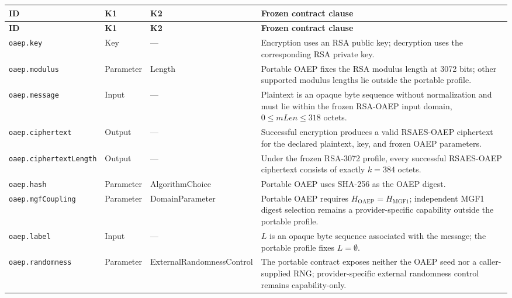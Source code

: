 \documentclass[11pt,a4paper]{article}
\begin{document}
\begin{longtable}{p{}p{}p{}p{}}
\toprule
\textbf{ID} & \textbf{K1} & \textbf{K2} & \textbf{Frozen contract clause}\\
\midrule
\endfirsthead
\toprule
\textbf{ID} & \textbf{K1} & \textbf{K2} & \textbf{Frozen contract clause}\\
\midrule
\endhead

\texttt{oaep.key} &
Key &
--- &
Encryption uses an RSA public key; decryption uses the corresponding RSA private key.\\

\texttt{oaep.modulus} &
Parameter &
Length &
Portable OAEP fixes the RSA modulus length at 3072 bits; other supported modulus lengths lie outside the portable profile.\\

\texttt{oaep.message} &
Input &
--- &
Plaintext is an opaque byte sequence without normalization and must lie within the frozen RSA-OAEP input domain, $0 \le mLen \le 318$ octets.\\

\texttt{oaep.ciphertext} &
Output &
--- &
Successful encryption produces a valid RSAES-OAEP ciphertext for the declared plaintext, key, and frozen OAEP parameters.\\

\texttt{oaep.ciphertextLength} &
Output &
--- &
Under the frozen RSA-3072 profile, every successful RSAES-OAEP ciphertext consists of exactly $k=384$ octets.\\

\texttt{oaep.hash} &
Parameter &
AlgorithmChoice &
Portable OAEP uses SHA-256 as the OAEP digest.\\

\texttt{oaep.mgfCoupling} &
Parameter &
DomainParameter &
Portable OAEP requires $H_{\mathrm{OAEP}}=H_{\mathrm{MGF1}}$; independent MGF1 digest selection remains a provider-specific capability outside the portable profile.\\

\texttt{oaep.label} &
Input &
--- &
$L$ is an opaque byte sequence associated with the message; the portable profile fixes $L=\emptyset$.\\

\texttt{oaep.randomness} &
Parameter &
ExternalRandomnessControl &
The portable contract exposes neither the OAEP seed nor a caller-supplied RNG; provider-specific external randomness control remains capability-only.\\


\end{longtable}
\end{document}
